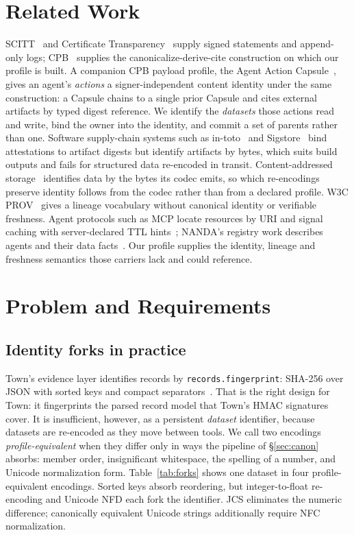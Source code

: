\documentclass[conference]{IEEEtran}
\begin{document}
\section{Related Work}
SCITT~\cite{rfc9943} and Certificate Transparency~\cite{rfc9162} supply signed statements and append-only logs; CPB~\cite{cpb03} supplies the canonicalize-derive-cite construction on which our profile is built. A companion CPB payload profile, the Agent Action Capsule~\cite{aac}, gives an agent's \emph{actions} a signer-independent content identity under the same construction: a Capsule chains to a single prior Capsule and cites external artifacts by typed digest reference. We identify the \emph{datasets} those actions read and write, bind the owner into the identity, and commit a set of parents rather than one. Software supply-chain systems such as in-toto~\cite{intoto} and Sigstore~\cite{sigstore} bind attestations to artifact digests but identify artifacts by bytes, which suits build outputs and fails for structured data re-encoded in transit. Content-addressed storage~\cite{ipfs} identifies data by the bytes its codec emits, so which re-encodings preserve identity follows from the codec rather than from a declared profile. W3C PROV~\cite{prov} gives a lineage vocabulary without canonical identity or verifiable freshness. Agent protocols such as MCP locate resources by URI and signal caching with server-declared TTL hints~\cite{mcp}; NANDA's registry work describes agents and their data facts~\cite{nanda}. Our profile supplies the identity, lineage and freshness semantics those carriers lack and could reference.

\section{Problem and Requirements}

\subsection{Identity forks in practice}
Town's evidence layer identifies records by \texttt{records.fingerprint}: SHA-256 over JSON with sorted keys and compact separators~\cite{town}. That is the right design for Town: it fingerprints the parsed record model that Town's HMAC signatures cover. It is insufficient, however, as a persistent \emph{dataset} identifier, because datasets are re-encoded as they move between tools. We call two encodings \emph{profile-equivalent} when they differ only in ways the pipeline of \S\ref{sec:canon} absorbs: member order, insignificant whitespace, the spelling of a number, and Unicode normalization form. Table~\ref{tab:forks} shows one dataset in four profile-equivalent encodings. Sorted keys absorb reordering, but integer-to-float re-encoding and Unicode NFD each fork the identifier. JCS eliminates the numeric difference; canonically equivalent Unicode strings additionally require NFC normalization.
\end{document}
